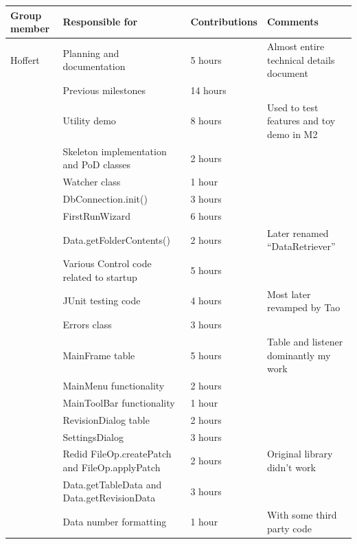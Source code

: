 \documentclass[12pt,a4paper]{article}
\begin{document}
\begin{longtable}{| p{2cm} | p{5cm} | p{3cm}| p{4.5cm} |}
  \hline
  \textbf{Group member} & \textbf{Responsible for} & \textbf{Contributions} & \textbf{Comments} \\ \hline
  Hoffert & Planning and documentation & 5 hours & Almost entire technical details document\\ \cline{2-4}
   & Previous milestones & 14 hours & \\ \cline{2-4}
   & Utility demo & 8 hours & Used to test features and toy demo in M2 \\ \cline{2-4}
   & Skeleton implementation and PoD classes & 2 hours & \\ \cline{2-4}
   & Watcher class & 1 hour & \\ \cline{2-4}
   & DbConnection.init() & 3 hours & \\ \cline{2-4}
   & FirstRunWizard & 6 hours & \\ \cline{2-4}
   & Data.getFolderContents() & 2 hours & Later renamed ``DataRetriever'' \\ \cline{2-4}
   & Various Control code related to startup & 5 hours & \\ \cline{2-4}
   & JUnit testing code & 4 hours & Most later revamped by Tao \\ \cline{2-4}
   & Errors class & 3 hours & \\ \cline{2-4}
   & MainFrame table & 5 hours & Table and listener dominantly my work \\ \cline{2-4}
   & MainMenu functionality & 2 hours & \\ \cline{2-4}
   & MainToolBar functionality & 1 hour & \\ \cline{2-4}
   & RevisionDialog table & 2 hours & \\ \cline{2-4}
   & SettingsDialog & 3 hours & \\ \cline{2-4}
   & Redid FileOp.createPatch and FileOp.applyPatch & 2 hours & Original library didn't work \\ \cline{2-4}
   & Data.getTableData and Data.getRevisionData & 3 hours & \\ \cline{2-4}
   & Data number formatting & 1 hour & With some third party code\\ \cline{2-4}

\end{longtable}
\end{document}
